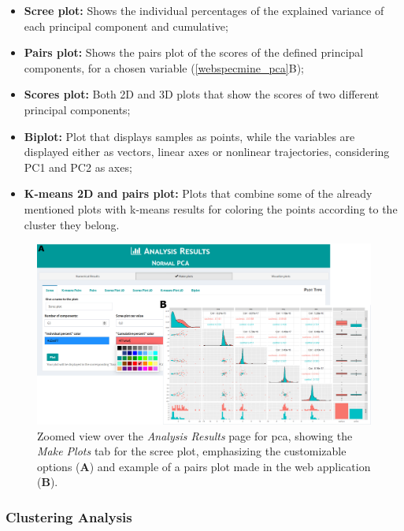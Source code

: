 \begin{itemize}
	\item \textbf{Scree plot:} Shows the individual percentages of the explained variance of each principal component and cumulative;
	
	\item \textbf{Pairs plot:} Shows the pairs plot of the scores of the defined principal components, for a chosen variable (\autoref{webspecmine_pca}B);
	
	\item \textbf{Scores plot:} Both 2D and 3D plots that show the scores of two different principal components;
	
	\item \textbf{Biplot:} Plot that displays samples as points, while the variables are displayed either as vectors, linear axes or nonlinear trajectories, considering PC1 and PC2 as axes;
	
	\item \textbf{K-means 2D and pairs plot:} Plots that combine some of the already mentioned plots with k-means results for coloring the points according to the cluster they belong.
			
\end{itemize}


\begin{figure}[h]
	\centering
	\includegraphics[width=1\linewidth]{Imagens/webspecmine_pca}
	\caption{Zoomed view over the \textit{Analysis Results} page for \gls{pca}, showing the \textit{Make Plots} tab for the scree plot, emphasizing the customizable options (\textbf{A}) and example of a pairs plot made in the web application (\textbf{B}).}
	\label{webspecmine_pca}
\end{figure}


\subsubsection{Clustering Analysis}

